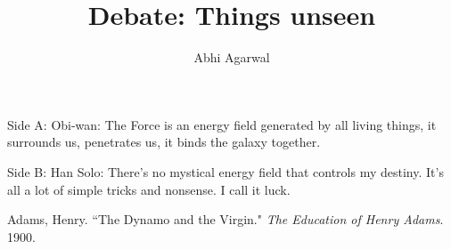 \documentclass[11pt, oneside]{article}
\title{Debate: Things unseen\vspace{-0.4cm}}
\author{Abhi Agarwal\vspace{-1cm}}
\date{}
\begin{document}
\maketitle

\par Side A: Obi-wan: The Force is an energy field generated by all living things, it surrounds us, penetrates us, it binds the galaxy together.

\par Side B: Han Solo: There's no mystical energy field that controls my destiny.  It's all a lot of simple tricks and nonsense.  I call it luck. 

\begin{workscited}
\bibent Adams, Henry.  ``The Dynamo and the Virgin."  \textit{The Education of Henry Adams}.  1900.
\end{workscited}
\end{document}
